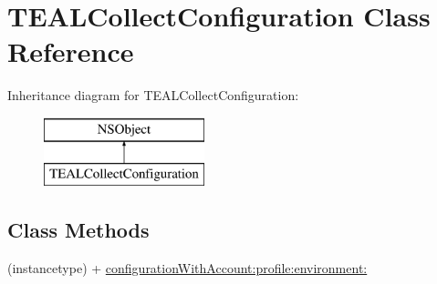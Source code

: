 \hypertarget{interface_t_e_a_l_collect_configuration}{}\section{T\+E\+A\+L\+Collect\+Configuration Class Reference}
\label{interface_t_e_a_l_collect_configuration}
Inheritance diagram for T\+E\+A\+L\+Collect\+Configuration\+:\begin{figure}[H]
\begin{center}
\leavevmode
\includegraphics[height=2.000000cm]{interface_t_e_a_l_collect_configuration}
\end{center}
\end{figure}
\subsection*{Class Methods}
\begin{DoxyCompactItemize}
\item 
(instancetype) + \hyperlink{interface_t_e_a_l_collect_configuration_a6eec21b4797e86df33cd94b4d60f1bb5}{configuration\+With\+Account\+:profile\+:environment\+:}
\end{DoxyCompactItemize}

